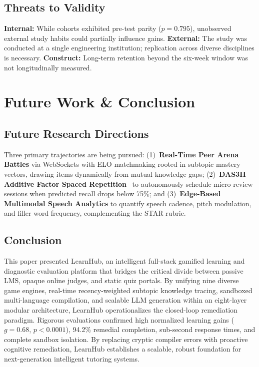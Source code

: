 \documentclass[journal]{IEEEtran}
\begin{document}
\subsection{Threats to Validity}
\textbf{Internal:} While cohorts exhibited pre-test parity ($p = 0.795$), unobserved external study habits could partially influence gains. \textbf{External:} The study was conducted at a single engineering institution; replication across diverse disciplines is necessary. \textbf{Construct:} Long-term retention beyond the six-week window was not longitudinally measured.

\section{Future Work \& Conclusion}
\label{sec:conclusion}
\subsection{Future Research Directions}
Three primary trajectories are being pursued: (1)~\textbf{Real-Time Peer Arena Battles} via WebSockets with ELO matchmaking rooted in subtopic mastery vectors, drawing items dynamically from mutual knowledge gaps; (2)~\textbf{DAS3H Additive Factor Spaced Repetition}~\cite{choffin2019} to autonomously schedule micro-review sessions when predicted recall drops below 75\%; and (3)~\textbf{Edge-Based Multimodal Speech Analytics} to quantify speech cadence, pitch modulation, and filler word frequency, complementing the STAR rubric.

\subsection{Conclusion}
This paper presented LearnHub, an intelligent full-stack gamified learning and diagnostic evaluation platform that bridges the critical divide between passive LMS, opaque online judges, and static quiz portals. By unifying nine diverse game engines, real-time recency-weighted subtopic knowledge tracing, sandboxed multi-language compilation, and scalable LLM generation within an eight-layer modular architecture, LearnHub operationalizes the closed-loop remediation paradigm. Rigorous evaluations confirmed high normalized learning gains ($g = 0.68$, $p < 0.0001$), 94.2\% remedial completion, sub-second response times, and complete sandbox isolation. By replacing cryptic compiler errors with proactive cognitive remediation, LearnHub establishes a scalable, robust foundation for next-generation intelligent tutoring systems.
\end{document}
